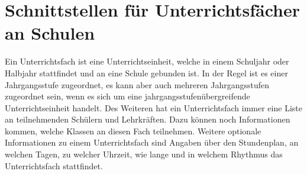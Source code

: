 \section{Schnittstellen für Unterrichtsfächer an Schulen}
Ein Unterrichtsfach ist eine Unterrichtseinheit, welche in einem Schuljahr oder Halbjahr stattfindet und an eine Schule gebunden ist.
In der Regel ist es einer Jahrgangsstufe zugeordnet, es kann aber auch mehreren Jahrgangsstufen zugeordnet sein, wenn es sich um eine jahrgangsstufenübergreifende Unterrichtseinheit handelt.
Des Weiteren hat ein Unterrichtsfach immer eine Liste an teilnehmenden Schülern und Lehrkräften.
Dazu können noch Informationen kommen, welche Klassen an diesen Fach teilnehmen.
Weitere optionale Informationen zu einem Unterrichtsfach sind Angaben über den Stundenplan, an welchen Tagen, zu welcher Uhrzeit, wie lange und in welchem Rhythmus das Unterrichtsfach stattfindet.





%




